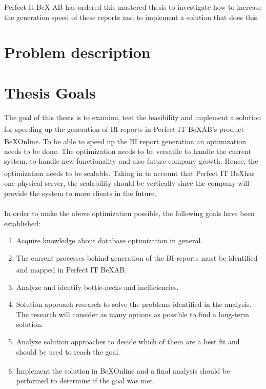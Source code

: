 \documentclass{cslthse-msc}
\newcommand{\bex}{BeX\textsuperscript{\textregistered}}
\begin{document}
Perfect It BeX AB has ordered this mastered thesis to investigate how to increase the generation speed of these reports and to implement a solution that does this.

\section{Problem description}

\section{Thesis Goals} \label{sec:goals}
The goal of this thesis is to examine, test the feasibility and implement a solution for speeding up the generation of BI reports in Perfect IT \bex AB's product \bex Online. To be able to speed up the BI report generation an optimization needs to be done. The optimization needs to be versatile to handle the current system, to handle new functionality and also future company growth. Hence, the optimization needs to be scalable. Taking in to account that Perfect IT \bex has one physical server, the scalability should be vertically \cite{scalability} since the company will provide the system to more clients in the future.\\\\
In order to make the above optimization possible, the following goals have been established:
\begin{enumerate}
\item Acquire knowledge about database optimization in general.
\item The current processes behind generation of the BI-reports must be identified and mapped in Perfect IT \bex AB.
\item Analyze and identify bottle-necks and inefficiencies.
\item Solution approach research to solve the problems identified in the analysis. The research will consider as many options as possible to find a long-term solution.
\item Analyze solution approaches to decide which of them are a best fit and should be used to reach the goal.
\item Implement the solution in \bex Online and a final analysis should be performed to determine if the goal was met.
\end{enumerate}
  
\end{document}
